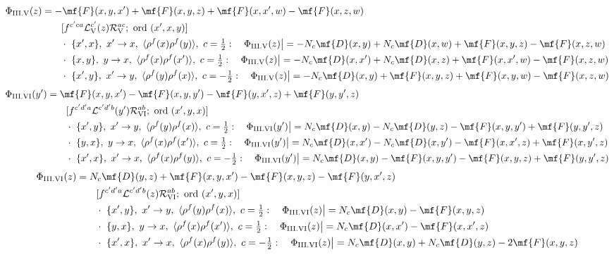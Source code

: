 \begin{align}
\Phi_{\rm III.V}(z)&=-\mf{F}(x,y,x')+\mf{F}(x,y,z)+\mf{F}(x,x',w)-\mf{F}(x,z,w)\notag\\&\qquad[f^{c'ca}\mathcal{L}_{\rm V}^{c'}(z)\mathcal{R}_{\rm V}^{ac};\ \text{ord}\ (x',x,y)]\notag\\
&\qquad\cdot\ \{x',x\},\ x'\to x,\ \langle\rho^{f}(x)\rho^{f}(y)\rangle,\ c=\tfrac{1}{2}:\quad \Phi_{\rm III.V}(z)\big|=-N_{c}\mf{D}(x,y)+N_{c}\mf{D}(x,w)+\mf{F}(x,y,z)-\mf{F}(x,z,w)\notag\\
&\qquad\cdot\ \{x,y\},\ y\to x,\ \langle\rho^{f}(x)\rho^{f}(x')\rangle,\ c=\tfrac{1}{2}:\quad \Phi_{\rm III.V}(z)\big|=-N_{c}\mf{D}(x,x')+N_{c}\mf{D}(x,z)+\mf{F}(x,x',w)-\mf{F}(x,z,w)\notag\\
&\qquad\cdot\ \{x',y\},\ x'\to y,\ \langle\rho^{f}(y)\rho^{f}(x)\rangle,\ c=-\tfrac{1}{2}:\quad \Phi_{\rm III.V}(z)\big|=-N_{c}\mf{D}(x,y)+\mf{F}(x,y,z)+\mf{F}(x,y,w)-\mf{F}(x,z,w)\notag
\end{align}
\begin{align}
\Phi_{\rm III.VI}(y')&=\mf{F}(x,y,x')-\mf{F}(x,y,y')-\mf{F}(y,x',z)+\mf{F}(y,y',z)\notag\\&\qquad[f^{c'd'a}\mathcal{L}^{c'd'b}(y')\mathcal{R}_{\rm VI}^{ab};\ \text{ord}\ (x',y,x)]\notag\\
&\qquad\cdot\ \{x',y\},\ x'\to y,\ \langle\rho^{f}(y)\rho^{f}(x)\rangle,\ c=\tfrac{1}{2}:\quad \Phi_{\rm III.VI}(y')\big|=N_{c}\mf{D}(x,y)-N_{c}\mf{D}(y,z)-\mf{F}(x,y,y')+\mf{F}(y,y',z)\notag\\
&\qquad\cdot\ \{y,x\},\ y\to x,\ \langle\rho^{f}(x)\rho^{f}(x')\rangle,\ c=\tfrac{1}{2}:\quad \Phi_{\rm III.VI}(y')\big|=N_{c}\mf{D}(x,x')-N_{c}\mf{D}(x,y')-\mf{F}(x,x',z)+\mf{F}(x,y',z)\notag\\
&\qquad\cdot\ \{x',x\},\ x'\to x,\ \langle\rho^{f}(x)\rho^{f}(y)\rangle,\ c=-\tfrac{1}{2}:\quad \Phi_{\rm III.VI}(y')\big|=N_{c}\mf{D}(x,y)-\mf{F}(x,y,y')-\mf{F}(x,y,z)+\mf{F}(y,y',z)\notag
\end{align}
\begin{align}
\Phi_{\rm III.VI}(z)&=N_{c}\mf{D}(y,z)+\mf{F}(x,y,x')-\mf{F}(x,y,z)-\mf{F}(y,x',z)\notag\\&\qquad[f^{c'd'a}\mathcal{L}^{c'd'b}(z)\mathcal{R}_{\rm VI}^{ab};\ \text{ord}\ (x',y,x)]\notag\\
&\qquad\cdot\ \{x',y\},\ x'\to y,\ \langle\rho^{f}(y)\rho^{f}(x)\rangle,\ c=\tfrac{1}{2}:\quad \Phi_{\rm III.VI}(z)\big|=N_{c}\mf{D}(x,y)-\mf{F}(x,y,z)\notag\\
&\qquad\cdot\ \{y,x\},\ y\to x,\ \langle\rho^{f}(x)\rho^{f}(x')\rangle,\ c=\tfrac{1}{2}:\quad \Phi_{\rm III.VI}(z)\big|=N_{c}\mf{D}(x,x')-\mf{F}(x,x',z)\notag\\
&\qquad\cdot\ \{x',x\},\ x'\to x,\ \langle\rho^{f}(x)\rho^{f}(y)\rangle,\ c=-\tfrac{1}{2}:\quad \Phi_{\rm III.VI}(z)\big|=N_{c}\mf{D}(x,y)+N_{c}\mf{D}(y,z)-2\mf{F}(x,y,z)\notag
\end{align}

